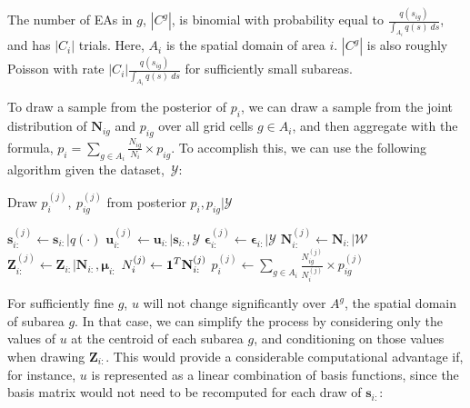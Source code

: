\documentclass[12pt]{article}
\newcommand{\bmone}{\mbox{\bf 1}}
\begin{document}
The number of EAs in $g$, $|C^g|$, is binomial with probability equal to $\frac{q(s_{ig})}{\int_{A_i} q(s) \ ds}$, and has $|C_i|$ trials. Here, $A_i$ is the spatial domain of area $i$.  $|C^g|$ is also roughly Poisson with rate $|C_i| \frac{q(s_{ig})}{\int_{A_i} q(s) \ ds}$ for sufficiently small subareas.

To draw a sample from the posterior of $p_i$, we can draw a sample from the joint distribution of $\boldsymbol{N}_{ig}$ and $p_{ig}$ over all grid cells $g \in A_i$, and then aggregate with the formula, $p_i = \sum_{g \in A_i} \frac{N_{ig}}{N_{i}} \times p_{ig}$. To accomplish this, we can use the following algorithm given the dataset,~$\mathscr{Y}$:

\begin{algorithm}[H]
\caption{Draw $p_i^{(j)}, \ p_{ig}^{(j)}$ from posterior $p_i, p_{ig} \vert  \mathscr{Y}$}
\label{alg:main}
\begin{algorithmic}[1]
\STATE $\mathbf{s}_{i:}^{(j)}\leftarrow \mathbf{s}_{i:} \vert q( \cdot )$
\STATE $\boldsymbol{u}_{i:}^{(j)} \leftarrow \boldsymbol{u}_{i:} \vert \mathbf{s}_{i:}, \mathscr{Y}$
\STATE $\boldsymbol{ \epsilon }_{i:}^{(j)} \leftarrow \boldsymbol{ \epsilon }_{i:}  \vert  \mathscr{Y} $
\STATE $\mathbf{N}_{i:}^{(j)} \leftarrow \mathbf{N}_{i:} \vert \mathscr{W}$
\STATE $\mathbf{Z}_{i:}^{(j)} \leftarrow \mathbf{Z}_{i:} \vert \mathbf{N}_{i:}, \boldsymbol{\mu}_{i:}$
\STATE $N_i^{(j)} \leftarrow \bmone^T \mathbf{N}_{i:}^{(j)}$
\ENDFOR
\STATE $p_i^{(j)} \leftarrow  \sum_{g \in A_i} \frac{N_{ig}^{(j)}}{N_{i}^{(j)}} \times p_{ig}^{(j)}$
\end{algorithmic}
\end{algorithm}

For sufficiently fine $g$, $u$ will not change significantly over $A^g$, the spatial domain of subarea $g$. In that case, we can simplify the process by considering only the values of $u$ at the centroid of each subarea $g$, and conditioning on those values when drawing $\boldsymbol{Z}_{i:}$.  This would provide a considerable computational advantage if, for instance, $u$ is represented as a linear combination of basis functions, since the basis matrix would not need to be recomputed for each draw of $\boldsymbol{s}_{i:}$:
\end{document}
